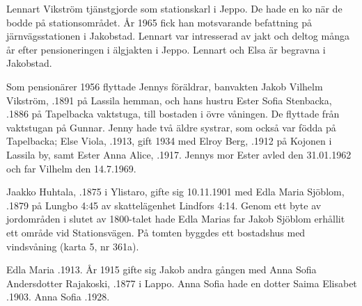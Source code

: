 Lennart Vikström tjänstgjorde som stationskarl i Jeppo. De hade en ko	när de bodde på stationsområdet. År 1965 fick han motsvarande	befattning på järnvägsstationen i Jakobstad. Lennart var intresserad av	jakt och deltog många år efter pensioneringen i älgjakten i Jeppo. Lennart och Elsa är begravna i Jakobstad.

Som pensionärer 1956 flyttade Jennys föräldrar, banvakten Jakob	Vilhelm Vikström, .1891 på Lassila hemman, och	hans hustru Ester Sofia Stenbacka, .1886 på Tapelbacka	vaktstuga, till bostaden i övre våningen. De flyttade från vaktstugan på Gunnar. Jenny hade två äldre systrar, som också var födda på Tapelbacka; Else Viola, .1913, gift 1934 med Elroy Berg, .1912 på Kojonen i Lassila by, samt Ester Anna Alice, .1917. Jennys mor Ester avled den 31.01.1962 och far Vilhelm den 14.7.1969.


%
Jaakko Huhtala, .1875 i Ylistaro, gifte sig 10.11.1901 med Edla Maria Sjöblom, .1879 på Lungbo 4:45 av skattelägenhet Lindfors 4:14. Genom ett byte av jordområden i slutet av 1800-talet hade Edla Marias far Jakob Sjöblom erhållit ett område vid Stationsvägen. På tomten byggdes ett bostadshus med vindsvåning (karta 5, nr 361a).
\begin{jhchildren}
  \item {}
  \item {}
  \item {}
  \item {}
  \item {}
\end{jhchildren}
Edla Maria .1913. År 1915 gifte sig Jakob andra gången med Anna Sofia Andersdotter Rajakoski, .1877 i Lappo. Anna Sofia hade en dotter Saima Elisabet .1903. Anna Sofia .1928.


%

